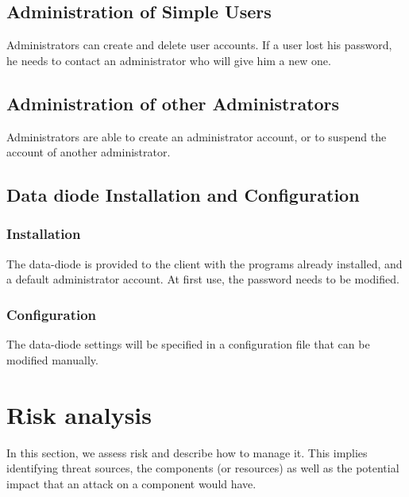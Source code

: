\documentclass[a4paper,11pt]{article}
\begin{document}
\subsection{Administration of Simple Users}
Administrators can create and delete user accounts. If a user lost his password, he needs to contact an administrator who will give him a new one.

\subsection{Administration of other Administrators}
Administrators are able to create an administrator account, or to suspend the account of another administrator.
\subsection{Data diode Installation and Configuration}
\subsubsection{Installation}
The data-diode is provided to the client with the programs already installed, and a default administrator account. At first use, the password needs to be modified.
\subsubsection{Configuration}
The data-diode settings will be specified in a configuration file that can be modified manually.
\section{Risk analysis}
In this section, we assess risk and describe how to manage it. This implies identifying threat sources, the components (or resources) as well as the potential impact that an attack on a component would have.
\end{document}
